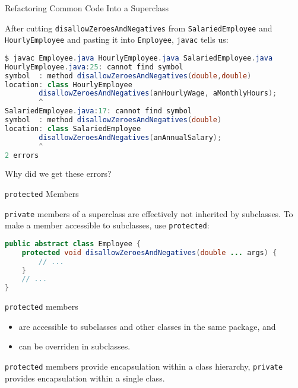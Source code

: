 \documentclass{beamer}
\begin{document}
\begin{frame}[fragile]{Refactoring Common Code Into a Superclass}


After cutting {\tt disallowZeroesAndNegatives} from {\tt SalariedEmployee} and {\tt HourlyEmployee} and pasting it into {\tt Employee}, {\tt javac} tells us:
\vspace{-.1in}
\begin{lstlisting}[language=Java]
$ javac Employee.java HourlyEmployee.java SalariedEmployee.java
HourlyEmployee.java:25: cannot find symbol
symbol  : method disallowZeroesAndNegatives(double,double)
location: class HourlyEmployee
        disallowZeroesAndNegatives(anHourlyWage, aMonthlyHours);
        ^
SalariedEmployee.java:17: cannot find symbol
symbol  : method disallowZeroesAndNegatives(double)
location: class SalariedEmployee
        disallowZeroesAndNegatives(anAnnualSalary);
        ^
2 errors
\end{lstlisting}
\vspace{-.1in}
Why did we get these errors?

\end{frame}

\begin{frame}[fragile]{{\tt protected} Members}


{\tt private} members of a superclass are effectively not inherited by subclasses.  To make a member accessible to subclasses, use {\tt protected}:
\begin{lstlisting}[language=Java]
public abstract class Employee {
    protected void disallowZeroesAndNegatives(double ... args) {
        // ...
    }
    // ...
}
\end{lstlisting}
{\tt protected} members
\begin{itemize}
\item are accessible to subclasses and other classes in the same package, and
\item can be overriden in subclasses.
\end{itemize}
{\tt protected} members provide encapsulation within a class hierarchy, {\tt private} provides encapsulation within a single class.

\end{frame}
\end{document}
